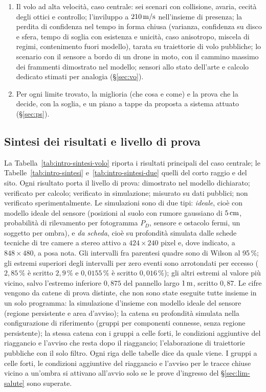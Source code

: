 \begin{enumerate}[label=\arabic*.]
\item Il volo ad alta velocità, caso centrale: sei scenari con collisione, avaria, cecità degli ottici e controllo; l'inviluppo a $210\,\mathrm{m/s}$ nell'insieme di presenza; la perdita di confidenza nel tempo in forma chiusa (varianza, confidenza su disco e sfera, tempo di soglia con esistenza e unicità, caso anisotropo, miscela di regimi, contenimento fuori modello), tarata su traiettorie di volo pubbliche; lo scenario con il sensore a bordo di un drone in moto, con il cammino massimo dei frammenti dimostrato nel modello; sensori allo stato dell'arte e calcolo dedicato stimati per analogia (\S\ref{sec:vo}).
\item Per ogni limite trovato, la miglioria (che cosa e come) e la prova che la decide, con la soglia, e un piano a tappe da proposta a sistema attuato (\S\ref{sec:ps}).
\end{enumerate}

\subsection{Sintesi dei risultati e livello di prova}\label{sec:intro-sintesi}

La Tabella~\ref{tab:intro-sintesi-volo} riporta i risultati principali del caso centrale; le Tabelle~\ref{tab:intro-sintesi} e~\ref{tab:intro-sintesi-due} quelli del corto raggio e del sito. Ogni risultato porta il livello di prova:  dimostrato nel modello dichiarato;  verificato per calcolo;  verificato in simulazione;  misurato su dati pubblici;  non verificato sperimentalmente. Le simulazioni sono di due tipi: \emph{ideale}, cioè con modello ideale del sensore (posizioni al suolo con rumore gaussiano di $5\,\mathrm{cm}$, probabilità di rilevamento per fotogramma $P_D$, sensore e ostacolo fermi, un soggetto per ombra), e \emph{da scheda}, cioè su profondità simulata dalle schede tecniche di tre camere a stereo attivo a $424\times240$ pixel e, dove indicato, a $848\times480$, a posa nota. Gli intervalli fra parentesi quadre sono di Wilson al 95\,\%; gli estremi superiori degli intervalli per zero eventi sono arrotondati per eccesso ($2{,}85\,\%$ è scritto $2{,}9\,\%$ e $0{,}0155\,\%$ è scritto $0{,}016\,\%$); gli altri estremi al valore più vicino, salvo l'estremo inferiore $0{,}875$ del pannello largo $1\,\mathrm{m}$, scritto $0{,}87$. Le cifre vengono da catene di prova distinte, che non sono state eseguite tutte insieme in un solo programma: la simulazione d'insieme con modello ideale del sensore (regione persistente e area d'avviso); la catena su profondità simulata nella configurazione di riferimento (gruppi per componenti connesse, senza regione persistente); la stessa catena con i gruppi a celle forti, le condizioni aggiuntive del riaggancio e l'avviso che resta dopo il riaggancio; l'elaborazione di traiettorie pubbliche con il solo filtro. Ogni riga delle tabelle dice da quale viene. I gruppi a celle forti, le condizioni aggiuntive del riaggancio e l'avviso per le tracce chiuse vicino a un'ombra si attivano all'avvio solo se le prove d'ingresso del \S\ref{sec:lim-salute} sono superate.

